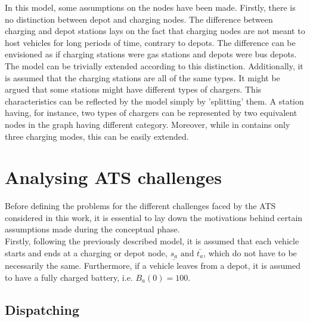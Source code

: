 In this model, some assumptions on the nodes have been made. Firstly, there is no distinction between depot and charging nodes. The difference between charging and depot stations lays on the fact that charging nodes are not meant to host vehicles for long periods of time, contrary to depots. The difference can be envisioned as if charging stations were gas stations and depots were bus depots. The  model can be trivially extended according to this distinction. Additionally, it is assumed that the charging stations are all of the same types. It might be argued that some stations might have different types of chargers. This characteristics can be reflected by the model simply by 'splitting' them. A station having, for instance, two types of chargers can be represented by two equivalent nodes in the graph having different category. Moreover, while in  contains only three charging modes, this can be easily extended. 


\section{Analysing ATS challenges}\label{sec:ats_challenges_analysis}
Before defining the problems for the different challenges faced by the ATS considered in this work, it is essential to lay down the motivations behind certain assumptions made during the conceptual phase. \\
Firstly, following the previously described model, it is assumed that each vehicle starts and ends at a charging or depot node, $\underline{s_a} \text{ and }\bar{t_a}$, which do not have to be necessarily the same. Furthermore, if a vehicle leaves from a depot, it is assumed to have a fully charged battery, i.e. $B_a(0) = 100$. 



\subsection{Dispatching}

